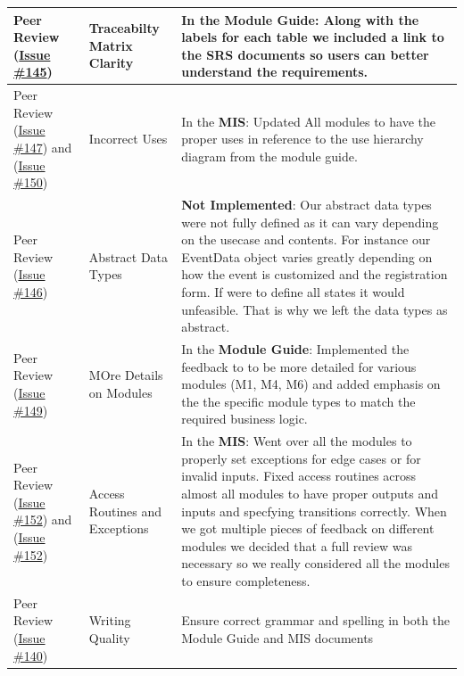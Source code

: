 \documentclass{article}
\begin{document}
\begin{longtable}{|>{\raggedright\arraybackslash}p{}|>{\raggedright\arraybackslash}p{}|>{\raggedright\arraybackslash}p{}|}
Peer Review (\href{https://github.com/VirochaanRG/MES-Event-Management-System/issues/145}{Issue \#145}) & Traceabilty Matrix Clarity & In the \textbf{Module Guide}: Along with the labels for each table we included a link to the SRS documents so users can better understand the requirements.\\
\hline
Peer Review (\href{https://github.com/VirochaanRG/MES-Event-Management-System/issues/147}{Issue \#147}) and (\href{https://github.com/VirochaanRG/MES-Event-Management-System/issues/150}{Issue \#150})&  Incorrect Uses & In the \textbf{MIS}: Updated All modules to have the proper uses in reference to the use hierarchy diagram from the module guide.\\
\hline
Peer Review (\href{https://github.com/VirochaanRG/MES-Event-Management-System/issues/146}{Issue \#146}) &  Abstract Data Types & \textbf{Not Implemented}: Our abstract data types were not fully defined as it can vary depending on the usecase and contents. For instance our EventData object varies greatly depending on how the event is customized and the registration form. If were to define all states it would unfeasible. That is why we left the data types as abstract. \\
\hline
Peer Review (\href{https://github.com/VirochaanRG/MES-Event-Management-System/issues/149}{Issue \#149}) & MOre Details on Modules & In the \textbf{Module Guide}: Implemented the feedback to to be more detailed for various modules (M1, M4, M6) and added emphasis on the the specific module types to match the required business logic.\\
\hline
Peer Review (\href{https://github.com/VirochaanRG/MES-Event-Management-System/issues/152}{Issue \#152}) and (\href{https://github.com/VirochaanRG/MES-Event-Management-System/issues/148}{Issue \#152})  & Access Routines and Exceptions & In the \textbf{MIS}: Went over all the modules to properly set exceptions for edge cases or for invalid inputs. Fixed access routines across almost all modules to have proper outputs and inputs and specfying transitions correctly. When we got multiple pieces of feedback on different modules we decided that a full review was necessary so we really considered all the modules to ensure completeness.\\
\hline
Peer Review (\href{https://github.com/VirochaanRG/MES-Event-Management-System/issues/140}{Issue \#140}) & Writing Quality& Ensure correct grammar and spelling in both the Module Guide and MIS documents\\
\hline
\end{longtable}
\end{document}
